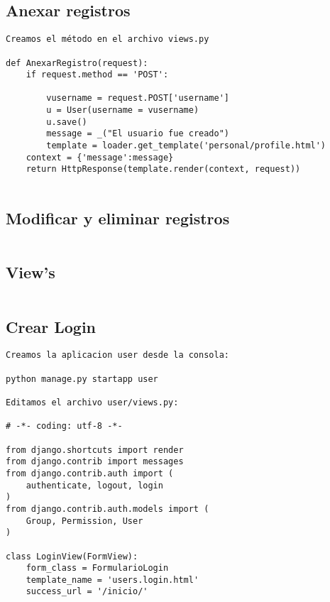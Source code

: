 \documentclass[xcolor=dvipsnames]{beamer}
\begin{document}
\subsection{Anexar registros}
\begin{frame}[fragile]
\begin{verbatim}
Creamos el método en el archivo views.py

def AnexarRegistro(request):
    if request.method == 'POST':
        
        vusername = request.POST['username']
        u = User(username = vusername)
        u.save()
        message = _("El usuario fue creado")
        template = loader.get_template('personal/profile.html')
    context = {'message':message}
    return HttpResponse(template.render(context, request))
       
\end{verbatim}
\end{frame}

\subsection{Modificar y eliminar registros}
\begin{frame}[fragile]
\begin{verbatim}

\end{verbatim}
\end{frame}

\subsection{View's}
\begin{frame}[fragile]
\begin{verbatim}

\end{verbatim}
\end{frame}

\subsection{Crear Login}
\begin{frame}[fragile]
\begin{verbatim}
Creamos la aplicacion user desde la consola:

python manage.py startapp user

Editamos el archivo user/views.py:

# -*- coding: utf-8 -*-

from django.shortcuts import render
from django.contrib import messages
from django.contrib.auth import (
    authenticate, logout, login
)
from django.contrib.auth.models import (
    Group, Permission, User
)

class LoginView(FormView):
    form_class = FormularioLogin
    template_name = 'users.login.html'
    success_url = '/inicio/'
    

\end{verbatim}
\end{frame}
\end{document}
